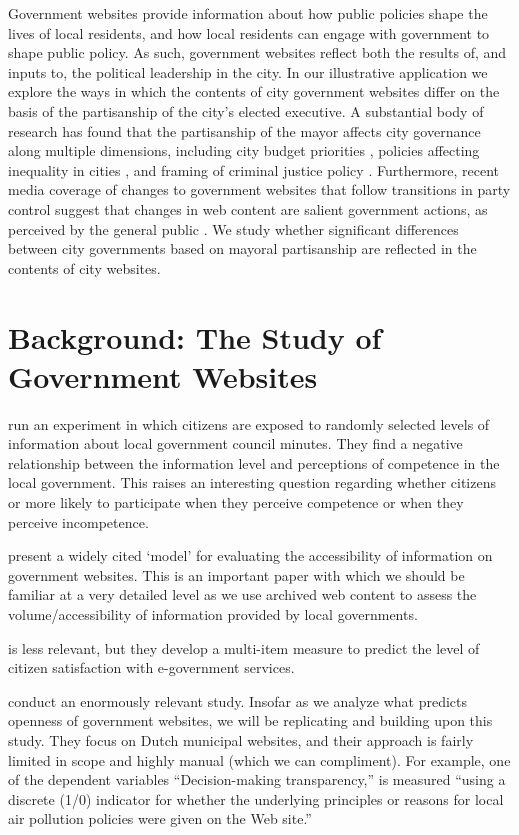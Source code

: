 \documentclass[11pt]{article}
\begin{document}
Government websites provide information about how public policies shape the lives of local residents, and how local residents can engage with government to shape public policy. As such, government websites reflect both the results of, and inputs to, the political leadership in the city. In our illustrative application we explore the ways in which the contents of city government websites differ on the basis of the partisanship of the city's elected executive. A substantial body of research has found that the partisanship of the mayor affects city governance along multiple dimensions, including city budget priorities \citep{de2016mayoral}, policies affecting inequality in cities \citep{einstein2016mayors}, and framing of criminal justice policy \citep{marion2013mayor}. Furthermore, recent media coverage of changes to government websites that follow transitions in party control suggest that changes in web content are salient government actions, as perceived by the general public \citep{sharfstein2017science,kirby2017trump,duarte2017deniable} . We study whether significant differences between city governments based on mayoral partisanship are reflected in the contents of city websites.


\section{Background: The Study of Government Websites}

\cite{grimmelikhuijsen2010transparency} run an experiment in which citizens are exposed to randomly selected levels of information about local government council minutes. They find a negative relationship between the information level and perceptions of competence in the local government. This raises an interesting question regarding whether citizens or more likely to participate when they perceive competence or when they perceive incompetence.

\cite{wang2005evaluating} present a widely cited `model' for evaluating the accessibility of information on government websites. This is an important paper with which we should be familiar at a very detailed level as we use archived web content to assess the volume/accessibility of information provided by local governments.

\cite{osman2014cobra} is less relevant, but they develop a multi-item measure to predict the level of citizen satisfaction with e-government services. 


\cite{grimmelikhuijsen2012developing} conduct an enormously relevant study. Insofar as we analyze what predicts openness of government websites, we will be replicating and building upon this study. They focus on Dutch municipal websites, and their approach is fairly limited in scope and highly manual (which we can compliment). For example, one of the dependent variables ``Decision-making transparency,'' is measured ``using a discrete (1/0) indicator for whether the underlying principles or reasons for local air pollution policies were given on the Web site.'' 
\end{document}
